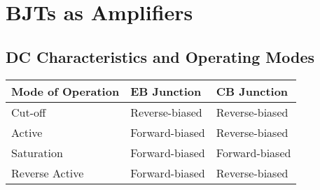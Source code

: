 \documentclass[a4paper,11pt]{article}
\begin{document}
	\newpage
	\section{BJTs as Amplifiers}
	\subsection{DC Characteristics and Operating Modes}
	\begin{center}
		\begin{tabular}{|l|l|l|}
			\hline
			Mode of Operation & EB Junction & CB Junction \\ \hline
			Cut-off & Reverse-biased & Reverse-biased \\ \hline
			Active & Forward-biased & Reverse-biased \\ \hline
			Saturation & Forward-biased & Forward-biased \\ \hline
			Reverse Active & Forward-biased & Reverse-biased \\ \hline
		\end{tabular}
	\end{center}
\end{document}
